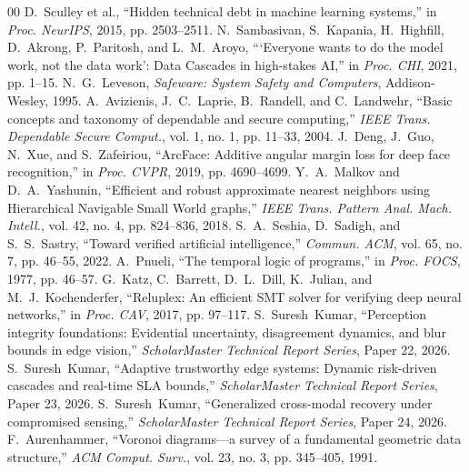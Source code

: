 \documentclass[conference]{IEEEtran}
\begin{document}
\begin{thebibliography}{00}
 D.~Sculley et al., ``Hidden technical debt in machine learning systems,'' in \emph{Proc. NeurIPS}, 2015, pp. 2503--2511.
 N.~Sambasivan, S.~Kapania, H.~Highfill, D.~Akrong, P.~Paritosh, and L.~M.~Aroyo, ```Everyone wants to do the model work, not the data work': Data Cascades in high-stakes AI,'' in \emph{Proc. CHI}, 2021, pp. 1--15.
 N.~G.~Leveson, \emph{Safeware: System Safety and Computers}, Addison-Wesley, 1995.
 A.~Avizienis, J.~C.~Laprie, B.~Randell, and C.~Landwehr, ``Basic concepts and taxonomy of dependable and secure computing,'' \emph{IEEE Trans. Dependable Secure Comput.}, vol. 1, no. 1, pp. 11--33, 2004.
 J.~Deng, J.~Guo, N.~Xue, and S.~Zafeiriou, ``ArcFace: Additive angular margin loss for deep face recognition,'' in \emph{Proc. CVPR}, 2019, pp. 4690--4699.
 Y.~A.~Malkov and D.~A.~Yashunin, ``Efficient and robust approximate nearest neighbors using Hierarchical Navigable Small World graphs,'' \emph{IEEE Trans. Pattern Anal. Mach. Intell.}, vol. 42, no. 4, pp. 824--836, 2018.
 S.~A.~Seshia, D.~Sadigh, and S.~S.~Sastry, ``Toward verified artificial intelligence,'' \emph{Commun. ACM}, vol. 65, no. 7, pp. 46--55, 2022.
 A.~Pnueli, ``The temporal logic of programs,'' in \emph{Proc. FOCS}, 1977, pp. 46--57.
 G.~Katz, C.~Barrett, D.~L.~Dill, K.~Julian, and M.~J.~Kochenderfer, ``Reluplex: An efficient SMT solver for verifying deep neural networks,'' in \emph{Proc. CAV}, 2017, pp. 97--117.
 S.~Suresh~Kumar, ``Perception integrity foundations: Evidential uncertainty, disagreement dynamics, and blur bounds in edge vision,'' \emph{ScholarMaster Technical Report Series}, Paper 22, 2026.
 S.~Suresh~Kumar, ``Adaptive trustworthy edge systems: Dynamic risk-driven cascades and real-time SLA bounds,'' \emph{ScholarMaster Technical Report Series}, Paper 23, 2026.
 S.~Suresh~Kumar, ``Generalized cross-modal recovery under compromised sensing,'' \emph{ScholarMaster Technical Report Series}, Paper 24, 2026.
 F.~Aurenhammer, ``Voronoi diagrams---a survey of a fundamental geometric data structure,'' \emph{ACM Comput. Surv.}, vol. 23, no. 3, pp. 345--405, 1991.
\end{thebibliography}
\end{document}
